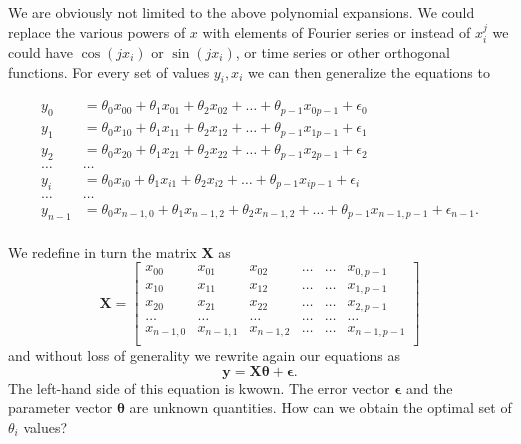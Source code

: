 \documentclass[%
oneside,                 %
final,                   %
10pt]{article}
\newenvironment{block_mdfboxadmon}[1][]{
\begin{block_mdfboxmdframed}[frametitle=#1]
}
{
\end{block_mdfboxmdframed}
}
\begin{document}
\begin{block_mdfboxadmon}[]

We are obviously not limited to the above polynomial expansions.  We
could replace the various powers of $x$ with elements of Fourier
series or instead of $x_i^j$ we could have $\cos{(j x_i)}$ or $\sin{(j
x_i)}$, or time series or other orthogonal functions.  For every set
of values $y_i,x_i$ we can then generalize the equations to

\begin{align*}
y_0&=\theta_0x_{00}+\theta_1x_{01}+\theta_2x_{02}+\dots+\theta_{p-1}x_{0p-1}+\epsilon_0\\
y_1&=\theta_0x_{10}+\theta_1x_{11}+\theta_2x_{12}+\dots+\theta_{p-1}x_{1p-1}+\epsilon_1\\
y_2&=\theta_0x_{20}+\theta_1x_{21}+\theta_2x_{22}+\dots+\theta_{p-1}x_{2p-1}+\epsilon_2\\
\dots & \dots \\
y_{i}&=\theta_0x_{i0}+\theta_1x_{i1}+\theta_2x_{i2}+\dots+\theta_{p-1}x_{ip-1}+\epsilon_i\\
\dots & \dots \\
y_{n-1}&=\theta_0x_{n-1,0}+\theta_1x_{n-1,2}+\theta_2x_{n-1,2}+\dots+\theta_{p-1}x_{n-1,p-1}+\epsilon_{n-1}.\\
\end{align*}
\end{block_mdfboxadmon} %





\begin{block_mdfboxadmon}[]
We redefine in turn the matrix $\bm{X}$ as
\[
\bm{X}=
\begin{bmatrix} 
x_{00}& x_{01} &x_{02}& \dots & \dots &x_{0,p-1}\\
x_{10}& x_{11} &x_{12}& \dots & \dots &x_{1,p-1}\\
x_{20}& x_{21} &x_{22}& \dots & \dots &x_{2,p-1}\\                      
\dots& \dots &\dots& \dots & \dots &\dots\\
x_{n-1,0}& x_{n-1,1} &x_{n-1,2}& \dots & \dots &x_{n-1,p-1}\\
\end{bmatrix} 
\]
and without loss of generality we rewrite again our equations as
\[
\bm{y} = \bm{X}\bm{\theta}+\bm{\epsilon}.
\]
The left-hand side of this equation is kwown. The error vector $\bm{\epsilon}$ and the parameter vector $\bm{\theta}$ are unknown quantities. How can we obtain the optimal set of $\theta_i$ values?
\end{block_mdfboxadmon} %
\end{document}
